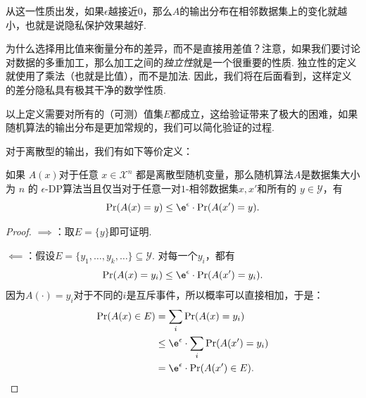 从这一性质出发，如果$\epsilon$越接近$0$，那么$A$的输出分布在相邻数据集上的变化就越小，也就是说隐私保护效果越好.

\begin{remark}
    为什么选择用比值来衡量分布的差异，而不是直接用差值？注意，如果我们要讨论对数据的多重加工，那么加工之间的\emph{独立性}就是一个很重要的性质. 独立性的定义就使用了乘法（也就是比值），而不是加法. 因此，我们将在后面看到，这样定义的差分隐私具有极其干净的数学性质. 
\end{remark}

以上定义需要对所有的（可测）值集$E$都成立，这给验证带来了极大的困难，如果随机算法的输出分布是更加常规的，我们可以简化验证的过程. 

对于离散型的输出，我们有如下等价定义：
\begin{proposition}\label{prop:discrete-dp}
    如果 $A(x)$对于任意 $x \in \mathcal X^n$ 都是离散型随机变量，那么随机算法$A$是数据集大小为 $n$ 的 $\epsilon$-DP算法当且仅当对于任意一对$1$-相邻数据集$x, x'$和所有的 $y \in \mathcal Y$，有
    \[
    \Pr(A(x) = y) \leq \e^{\epsilon} \cdot \Pr(A(x') = y).
    \]
\end{proposition}
\begin{proof}
$\implies$：取$E = \{y\}$即可证明.

$\impliedby$：假设$E=\{y_1,\dots,y_k,\dots\}\subseteq\mathcal Y$. 对每一个$y_i$，都有
    \[
    \Pr(A(x) = y_i) \leq \e^{\epsilon} \cdot \Pr(A(x') = y_i).
    \]
因为$A(\cdot)=y_i$对于不同的$i$是互斥事件，所以概率可以直接相加，于是：
    \begin{align*}
    \Pr(A(x) \in E) &= \sum_i \Pr(A(x) = y_i) \\
    &\leq \e^{\epsilon} \cdot \sum_i\Pr(A(x') = y_i) \\
    &= \e^{\epsilon} \cdot \Pr(A(x') \in E).
    \end{align*}
\end{proof}

